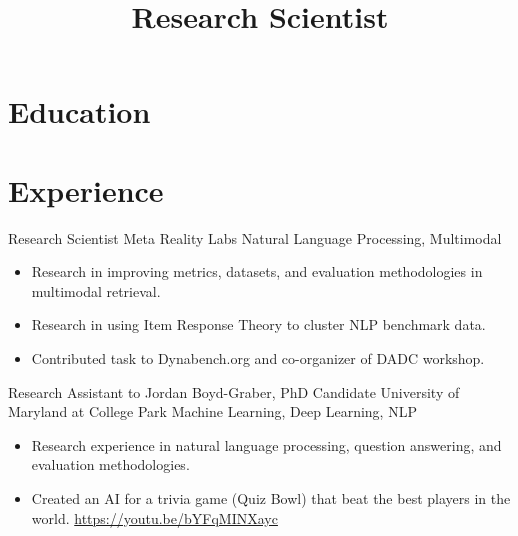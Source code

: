 \documentclass[11pt,a4paper,sans]{moderncv} %
\title{Research Scientist}
\begin{document}
\makecvtitle %
\vspace{-8ex}

\section{Education}





\section{Experience}
		{Research Scientist}
		{Meta Reality Labs}
		{Natural Language Processing, Multimodal}
		{}
		{
			\begin{itemize}
				\item Research in improving metrics, datasets, and evaluation methodologies in multimodal retrieval.
				\item Research in using Item Response Theory to cluster NLP benchmark data.
				\item Contributed task to Dynabench.org and co-organizer of DADC workshop.
			\end{itemize}
		}

		{Research Assistant to Jordan Boyd-Graber, PhD Candidate}
		{University of Maryland at College Park}
		{Machine Learning, Deep Learning, NLP}
		{}
		{
			\begin{itemize}
			\item Research experience in natural language processing, question answering, and evaluation methodologies.
      \item Created an AI for a trivia game (Quiz Bowl) that beat the best players in the world. \url{https://youtu.be/bYFqMINXayc}
			\end{itemize}
		}
\end{document}
